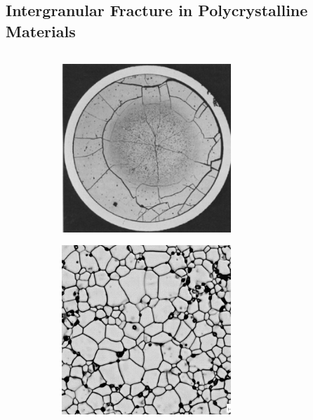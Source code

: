 \subsection{Intergranular Fracture in Polycrystalline Materials}
\subsectioncover

\begin{frame}
  \vspace{-1.5em}
  \begin{columns}[T]
    \begin{column}{0.5\textwidth}
      \begin{figure}
        \centering
        \begin{subfigure}{0.45\textwidth}
          \centering
          \includegraphics[width=0.7\textwidth]{Chapter345/figures/fuel}
        \end{subfigure}
        \begin{subfigure}{0.45\textwidth}
          \centering
          \includegraphics[width=0.7\textwidth]{Chapter345/figures/UO2_micro}
        \end{subfigure}
      \end{figure}
      

\end{column}
\end{columns}
\end{frame}
